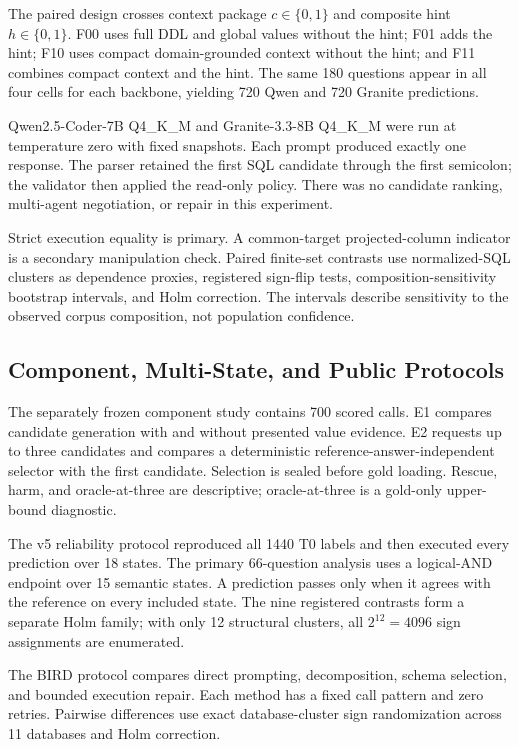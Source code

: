 \documentclass[applsci,article,submit,moreauthors]{Definitions/mdpi}
\begin{document}
The paired design crosses context package $c\in\{0,1\}$ and composite hint $h\in\{0,1\}$. F00 uses full DDL and global values without the hint; F01 adds the hint; F10 uses compact domain-grounded context without the hint; and F11 combines compact context and the hint. The same 180 questions appear in all four cells for each backbone, yielding 720 Qwen and 720 Granite predictions.

Qwen2.5-Coder-7B Q4\_K\_M and Granite-3.3-8B Q4\_K\_M were run at temperature zero with fixed snapshots. Each prompt produced exactly one response. The parser retained the first SQL candidate through the first semicolon; the validator then applied the read-only policy. There was no candidate ranking, multi-agent negotiation, or repair in this experiment.

Strict execution equality is primary. A common-target projected-column indicator is a secondary manipulation check. Paired finite-set contrasts use normalized-SQL clusters as dependence proxies, registered sign-flip tests, composition-sensitivity bootstrap intervals, and Holm correction. The intervals describe sensitivity to the observed corpus composition, not population confidence.

\subsection{Component, Multi-State, and Public Protocols}

The separately frozen component study contains 700 scored calls. E1 compares candidate generation with and without presented value evidence. E2 requests up to three candidates and compares a deterministic reference-answer-independent selector with the first candidate. Selection is sealed before gold loading. Rescue, harm, and oracle-at-three are descriptive; oracle-at-three is a gold-only upper-bound diagnostic.

The v5 reliability protocol reproduced all 1440 T0 labels and then executed every prediction over 18 states. The primary 66-question analysis uses a logical-AND endpoint over 15 semantic states. A prediction passes only when it agrees with the reference on every included state. The nine registered contrasts form a separate Holm family; with only 12 structural clusters, all $2^{12}=4096$ sign assignments are enumerated.

The BIRD protocol compares direct prompting, decomposition, schema selection, and bounded execution repair. Each method has a fixed call pattern and zero retries. Pairwise differences use exact database-cluster sign randomization across 11 databases and Holm correction.
\end{document}
